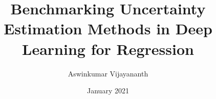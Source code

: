 \documentclass[rnd]{mas_report}
\author{Aswinkumar Vijayananth}
\title{Benchmarking Uncertainty Estimation Methods in Deep Learning for Regression}
\date{January 2021}
\begin{document}
\frontmatter

\begin{titlepage}
    \maketitle
\end{titlepage}

\cleardoublepage
{}

\pagestyle{plain}
\cleardoublepage
\statementpage




\tableofcontents
\listoffigures
\listoftables

\mainmatter %

\pagestyle{mainmatter}









\begin{appendices}
    
\end{appendices}

\backmatter


\nocite{*}
\end{document}

